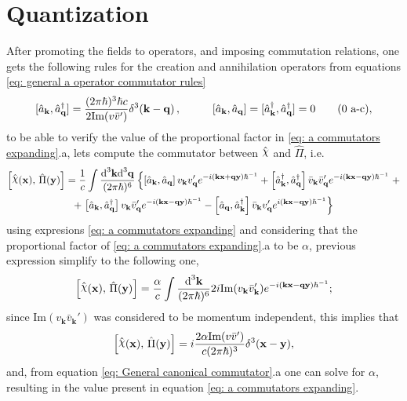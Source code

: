 \section{Quantization}
After promoting the fields to operators, and imposing commutation relations, one gets the following rules for the creation and annihilation operators from equations \ref{eq: general a operator commutator rules}
\begin{subequations}\label{eq: a commutators expanding}
	\begin{gather}
		[\hat{a}_\mathbf{k},\hat{a}_\mathbf{q}^\dagger]=\frac{(2\pi\hbar)^3\hbar c}{2\text{Im}(v\bar v')}\delta^3(\mathbf{k}-\mathbf{q})\,,\hspace{1.0cm}[\hat{a}_\mathbf{k},\hat{a}_\mathbf{q}]=[\hat{a}_\mathbf{k}^\dagger,\hat{a}_\mathbf{q}^\dagger]=0\tag{\theequation \,\,a-c},
	\end{gather}
\end{subequations}
to be able to verify the value of the proportional factor in \ref{eq: a commutators expanding}.a, lets compute the commutator between $\hat\rchi$ and $\hat\Pi$, i.e.
\begin{multline}
	\left[\hat{\rchi}(\mathbf{x}),\,\hat{\Pi}(\mathbf{y})\right]=\frac{1}{c}\int\frac{\td^3\mathbf{k}\td^3\mathbf{q}}{(2\pi\hbar)^6}\left\{\left[\hat{a}_\mathbf{k},\hat{a}_\mathbf{q}\right]v_\mathbf{k}v'_\mathbf{q}e^{-i\left(\mathbf{kx}+\mathbf{qy}\right)\hbar^{-1}}+\left[\hat{a}_\mathbf{k}^\dagger, \hat{a}_\mathbf{q}^\dagger\right]\bar v_\mathbf{k}\bar v_\mathbf{q}'e^{-i(\mathbf{kx}-\mathbf{qy})\hbar^{-1}}\right.+\\
	+\left.\left[\hat{a}_\mathbf{k},\hat{a}_\mathbf{q}^\dagger\right] v_\mathbf{k}\bar v'_\mathbf{q}e^{-i(\mathbf{kx}-\mathbf{qy})\hbar^{-1}}-\left[\hat{a}_\mathbf{q},\hat{a}_\mathbf{k}^\dagger\right]\bar v_\mathbf{k}v_\mathbf{q}'e^{i(\mathbf{kx}-\mathbf{qy})\hbar^{-1}}\right\}
\end{multline}
using expresions \ref{eq: a commutators expanding} and considering that the proportional factor of \ref{eq: a commutators expanding}.a to be $\alpha$, previous expression simplify to the following one,
\begin{equation}
	\left[\hat{\rchi}(\mathbf{x}),\,\hat{\Pi}(\mathbf{y})\right]=\frac{\alpha}{c}\int\frac{\td^3\mathbf{k}}{(2\pi\hbar)^6}2i\text{Im}(v_\mathbf{k}\bar v_\mathbf{k}')e^{-i(\mathbf{kx}-\mathbf{qy})\hbar^{-1}};
\end{equation}
since $\text{Im}(v_\mathbf{k}\bar v_\mathbf{k}')$ was considered to be momentum independent, this implies that
\begin{equation}
	\left[\hat{\rchi}(\mathbf{x}),\,\hat{\Pi}(\mathbf{y})\right]=i\frac{2\alpha\text{Im}(v\bar v')}{c(2\pi\hbar)^3}\delta^3(\mathbf{x}-\mathbf{y}),
\end{equation}
and, from equation \ref{eq: General canonical commutator}.a one can solve for $\alpha$, resulting in the value present in equation \ref{eq: a commutators expanding}.

